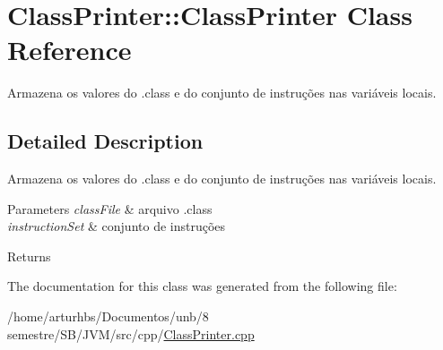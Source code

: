 \hypertarget{classClassPrinter_1_1ClassPrinter}{}\section{Class\+Printer\+:\+:Class\+Printer Class Reference}
\label{classClassPrinter_1_1ClassPrinter}


Armazena os valores do .class e do conjunto de instruções nas variáveis locais.  




\subsection{Detailed Description}
Armazena os valores do .class e do conjunto de instruções nas variáveis locais. 


\begin{DoxyParams}{Parameters}
{\em class\+File} & arquivo .class \\
\hline
{\em instruction\+Set} & conjunto de instruções \\
\hline
\end{DoxyParams}
\begin{DoxyReturn}{Returns}

\end{DoxyReturn}


The documentation for this class was generated from the following file\+:\begin{DoxyCompactItemize}
\item 
/home/arturhbs/\+Documentos/unb/8 semestre/\+S\+B/\+J\+V\+M/src/cpp/\hyperlink{ClassPrinter_8cpp}{Class\+Printer.\+cpp}\end{DoxyCompactItemize}

